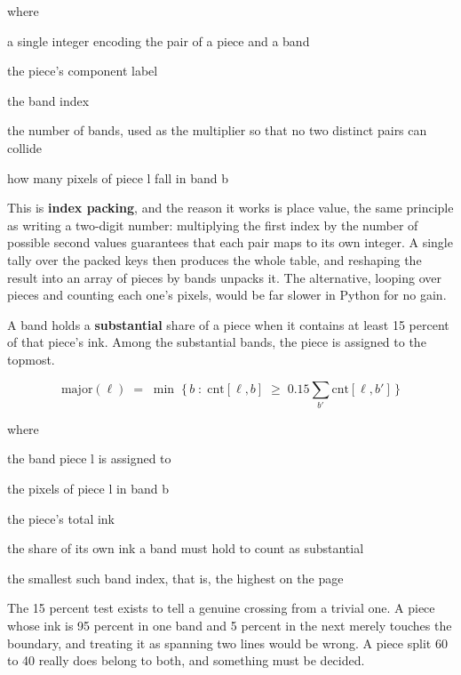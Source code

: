 \noindent where
\begin{description}[leftmargin=2.4em,style=nextline,font=\normalfont\ttfamily]\setlength\itemsep{1pt}
  \item[{$\mathrm{key}$}] \normalfont a single integer encoding the pair of a piece and a band
  \item[{$\ell$}] \normalfont the piece's component label
  \item[{$b$}] \normalfont the band index
  \item[{$L$}] \normalfont the number of bands, used as the multiplier so that no two distinct pairs can collide
  \item[{$\mathrm{cnt}[\ell,b]$}] \normalfont how many pixels of piece l fall in band b
\end{description}
This is \textbf{index packing}, and the reason it works is place value, the same principle as writing a two-digit number: multiplying the first index by the number of possible second values guarantees that each pair maps to its own integer. A single tally over the packed keys then produces the whole table, and reshaping the result into an array of pieces by bands unpacks it. The alternative, looping over pieces and counting each one's pixels, would be far slower in Python for no gain.


A band holds a \textbf{substantial} share of a piece when it contains at least 15 percent of that piece's ink. Among the substantial bands, the piece is assigned to the topmost.


\begin{equation}
\mathrm{major}(\ell) \;=\; \min\;\big\{\, b \;:\; \mathrm{cnt}[\ell,b] \;\ge\; 0.15 \textstyle\sum_{b'} \mathrm{cnt}[\ell,b'] \,\big\}
\end{equation}

\noindent where
\begin{description}[leftmargin=2.4em,style=nextline,font=\normalfont\ttfamily]\setlength\itemsep{1pt}
  \item[{$\mathrm{major}(\ell)$}] \normalfont the band piece l is assigned to
  \item[{$\mathrm{cnt}[\ell,b]$}] \normalfont the pixels of piece l in band b
  \item[{$\sum_{b'} \mathrm{cnt}[\ell,b']$}] \normalfont the piece's total ink
  \item[{$0.15$}] \normalfont the share of its own ink a band must hold to count as substantial
  \item[{$\min$}] \normalfont the smallest such band index, that is, the highest on the page
\end{description}
The 15 percent test exists to tell a genuine crossing from a trivial one. A piece whose ink is 95 percent in one band and 5 percent in the next merely touches the boundary, and treating it as spanning two lines would be wrong. A piece split 60 to 40 really does belong to both, and something must be decided.

